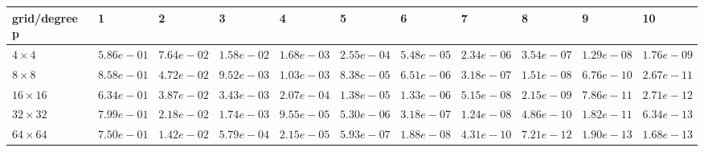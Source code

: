 \begin{tabular}{lllllllllll}
\hline
 grid/degree p   & 1          & 2          & 3          & 4          & 5          & 6          & 7          & 8          & 9          & 10         \\
\hline
 $4 \times 4$    & $5.86e-01$ & $7.64e-02$ & $1.58e-02$ & $1.68e-03$ & $2.55e-04$ & $5.48e-05$ & $2.34e-06$ & $3.54e-07$ & $1.29e-08$ & $1.76e-09$ \\
 $8 \times 8$    & $8.58e-01$ & $4.72e-02$ & $9.52e-03$ & $1.03e-03$ & $8.38e-05$ & $6.51e-06$ & $3.18e-07$ & $1.51e-08$ & $6.76e-10$ & $2.67e-11$ \\
 $16 \times 16$  & $6.34e-01$ & $3.87e-02$ & $3.43e-03$ & $2.07e-04$ & $1.38e-05$ & $1.33e-06$ & $5.15e-08$ & $2.15e-09$ & $7.86e-11$ & $2.71e-12$ \\
 $32 \times 32$  & $7.99e-01$ & $2.18e-02$ & $1.74e-03$ & $9.55e-05$ & $5.30e-06$ & $3.18e-07$ & $1.24e-08$ & $4.86e-10$ & $1.82e-11$ & $6.34e-13$ \\
 $64 \times 64$  & $7.50e-01$ & $1.42e-02$ & $5.79e-04$ & $2.15e-05$ & $5.93e-07$ & $1.88e-08$ & $4.31e-10$ & $7.21e-12$ & $1.90e-13$ & $1.68e-13$ \\
\hline
\end{tabular}